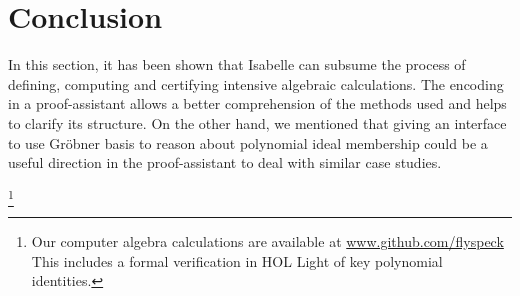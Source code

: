 \documentclass{llncs}
\begin{document}
\section{Conclusion}

In this section, it has been shown that Isabelle can subsume the
process of defining, computing and certifying intensive algebraic
calculations. The encoding in a proof-assistant allows a better
comprehension of the methods used and helps to clarify its
structure. On the other hand, we mentioned that giving an interface to
use Gr\"{o}bner basis to reason about polynomial ideal membership
could be a useful direction in the proof-assistant to deal with
similar case studies.

\footnote{Our computer algebra
  calculations are available at \url{www.github.com/flyspeck}
   This
  includes a formal verification in HOL Light of key polynomial
  identities.}

\newpage


 

\end{document}
